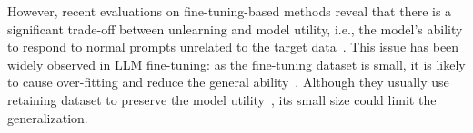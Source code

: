 However, recent evaluations on fine-tuning-based methods reveal that {there is} a significant trade-off between unlearning and model utility, i.e., the model’s ability to respond to normal prompts unrelated to the target data~\cite{wang2024unlearning, si2023knowledge, wu2024evaluating}. 
This issue has been widely observed in LLM fine-tuning: as the fine-tuning dataset is small, it is likely to cause over-fitting and reduce the general ability~\cite{luo2023empirical, zhai2023investigating, howard2018universal}. 
Although they usually use retaining dataset to preserve the model utility~\citep{liu2022continual, shi2024muse}, its small size could limit the generalization.






